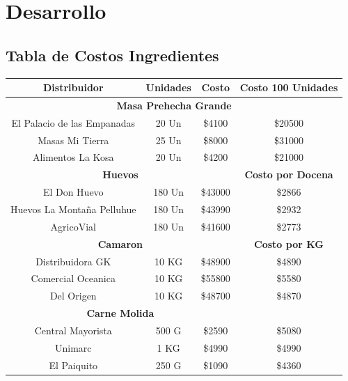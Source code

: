 \documentclass[12pt]{article}
\begin{document}
\section{Desarrollo} %

\subsection{Tabla de Costos Ingredientes}

\begin{table}[h!]
    \centering
    \begin{tabular}{|| c | c | c | c||} %
        \hline
    \textbf{Distribuidor} & Unidades & \textbf{Costo} & \textbf{Costo 100 Unidades} \\ [0.5ex]
        \hline\hline
        \multicolumn{4}{||c||}{\textbf{Masa Prehecha Grande}} \\ [0.5ex] \hline \hline
        El Palacio de las Empanadas & 20 Un & \$4100 & \$20500 \\ \hline
        Masas Mi Tierra & 25 Un & \$8000 & \$31000 \\ \hline
        Alimentos La Kosa & 20 Un & \$4200 & \$21000 \\ [1ex] \hline \hline

        \multicolumn{3}{||c||}{\textbf{Huevos}} & \textbf{Costo por Docena} \\ [0.5ex] \hline \hline
        El Don Huevo & 180 Un & \$43000 & \$2866 \\ \hline
        Huevos La Montaña Pelluhue & 180 Un & \$43990 & \$2932 \\ \hline
        AgricoVial & 180 Un & \$41600 & \$2773 \\ [1ex] \hline \hline

        \multicolumn{3}{||c|}{\textbf{Camaron}} & \textbf{Costo por KG} \\ [0.5ex] \hline \hline
        Distribuidora GK & 10 KG & \$48900 & \$4890 \\ \hline
        Comercial Oceanica & 10 KG & \$55800 & \$5580 \\ \hline
        Del Origen & 10 KG & \$48700 & \$4870 \\ [1ex] \hline \hline

        \multicolumn{3}{||c|}{\textbf{Carne Molida}} & \\ [0.5ex] \hline \hline
        Central Mayorista & 500 G & \$2590 & \$5080 \\ \hline \hline
        Unimarc & 1 KG & \$4990 & \$4990 \\ \hline \hline
        El Paiquito & 250 G & \$1090 & \$4360 \\ [1ex] \hline \hline



\end{tabular}
\end{table}
\end{document}
